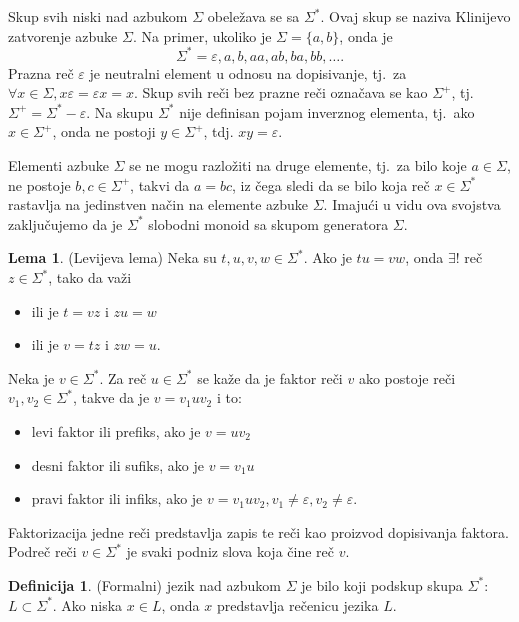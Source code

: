 \documentclass[12pt,oneside]{memoir}
\theoremstyle{plain}
\theoremstyle{definition}
\newtheorem{defn}{Definicija} %
\newtheorem{lem}{Lema} %
\begin{document}
Skup svih niski nad azbukom $\Sigma$ obeležava se sa $\Sigma^*$. Ovaj skup se naziva Klinijevo zatvorenje azbuke $\Sigma$. Na primer, ukoliko je $\Sigma = \{a,b\}$, onda je $$\Sigma^* = { \varepsilon, a, b, aa, ab, ba, bb, …}.$$
Prazna reč $\varepsilon$ je neutralni element u odnosu na dopisivanje, tj.~za $\forall x\in \Sigma, x\varepsilon = \varepsilon x = x$. Skup svih reči bez prazne reči označava se kao $\Sigma^+$, tj.~$\Sigma^+ = \Sigma^* - { \varepsilon }$. Na skupu $\Sigma^*$ nije definisan pojam inverznog elementa, tj.~ako $x \in \Sigma^+$, onda ne postoji $y \in \Sigma^+$, tdj. $xy = \varepsilon$.

Elementi azbuke $\Sigma$ se ne mogu razložiti na druge elemente, tj.~za bilo koje $a \in \Sigma$, ne postoje $b,c  \in \Sigma^+$, takvi da $a = bc$, iz čega sledi da se bilo koja reč $x \in \Sigma^*$ rastavlja na jedinstven način na elemente azbuke $\Sigma$. Imajući u vidu ova svojstva zaključujemo da je $\Sigma^*$ slobodni monoid sa skupom generatora $\Sigma$.
\begin{lem}
(Levijeva lema) Neka su $t, u, v, w \in \Sigma^*$. Ako je $tu = vw$, onda $\exists !$ reč $z  \in \Sigma^*$, tako da važi
	\begin{itemize}
	\item ili je $t = vz$ i $zu = w$
	\item ili je $v = tz$ i $zw = u.$
	\end{itemize}
\end{lem}

Neka je $v \in \Sigma^*$. Za reč $u \in \Sigma^*$ se kaže da je faktor reči $v$ ako postoje reči $v_1, v_2 \in \Sigma^*$, takve da je $v = v_1uv_2$ i to:
\begin{itemize}
\item levi faktor ili prefiks, ako je $v=uv_2$
\item desni faktor ili sufiks, ako je $v = v_1u$
\item pravi faktor ili infiks, ako je $v = v_1uv_2, v_1 \neq \varepsilon, v_2 \neq \varepsilon.$
\end{itemize}
Faktorizacija jedne reči predstavlja zapis te reči kao proizvod dopisivanja faktora. Podreč reči $v \in \Sigma^*$ je svaki podniz slova koja čine reč $v$.

\begin{defn}
(Formalni) jezik nad azbukom $\Sigma$ je bilo koji podskup skupa $\Sigma^*$: $L \subset \Sigma^*$. Ako niska $x \in L$, onda $x$ predstavlja rečenicu jezika $L$.
\end{defn}
\end{document}
